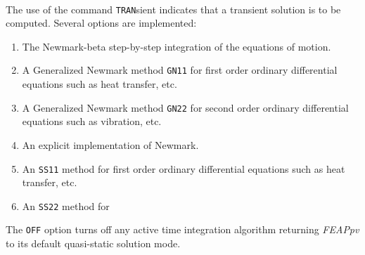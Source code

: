 \\{\smallskip}
\headb

The use of the command {\tt TRAN}sient indicates that a
transient solution is to be computed.  Several options are
implemented:
\begin{enumerate}
\item{
The Newmark-beta step-by-step integration of the equations of motion.
}
\item{
A Generalized Newmark method \texttt{GN11} for
first order ordinary differential equations such as heat transfer, etc.
}
\item{
A Generalized Newmark method \texttt{GN22} for
second order ordinary differential equations such as vibration, etc.
}
\item{
An explicit implementation of Newmark.
}
\item{
An \texttt{SS11} method for
first order ordinary differential equations such as heat transfer, etc.
}
\item{
An \texttt{SS22} method for
}
\end{enumerate}

The {\tt OFF} option turns off any active time integration algorithm returning
{\sl FEAPpv} to its default quasi-static solution mode.


